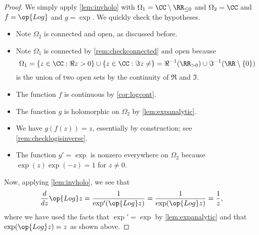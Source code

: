 \documentclass[../notes.tex]{subfiles}
\begin{document}
\begin{proof}
	We simply apply \autoref{lem:invholo} with $\Omega_1=\CC\setminus\RR_{\le0}$ and $\Omega_2=\CC$ and $f=\op{Log}$ and $g=\exp$. We quickly check the hypotheses.
	\begin{itemize}
		\item Note $\Omega_2$ is connected and open, as discussed before.
		\item Note $\Omega_1$ is connected by \autoref{rem:checkconnected} and open because
		\[\Omega_1=\{z\in\CC:\Re z>0\}\cup\{z\in\CC:\Im z\ne\}=\Re^{-1}(\RR_{>0})\cup\Im^{-1}(\RR\setminus\{0\})\]
		is the union of two open sets by the continuity of $\Re$ and $\Im$.
		\item The function $f$ is continuous by \autoref{cor:logcont}.
		\item The function $g$ is holomorphic on $\Omega_2$ by \autoref{lem:expanalytic}.
		\item We have $g(f(z))=z$, essentially by construction; see \autoref{rem:checklogisinverse}.
		\item The function $g'=\exp$ is nonzero everywhere on $\Omega_2$ because $\exp(z)\exp(-z)=1$ for $z\ne0$.
	\end{itemize}
	Now, applying \autoref{lem:invholo}, we see that
	\[\frac d{dz}\op{Log}z=\frac1{\exp'(\op{Log}z)}=\frac1{\exp(\op{Log}z)}=\frac1z,\]
	where we have used the facts that $\exp'=\exp$ by \autoref{lem:expanalytic} and that $\exp(\op{Log}z)=z$ as shown above.
\end{proof}
\end{document}

